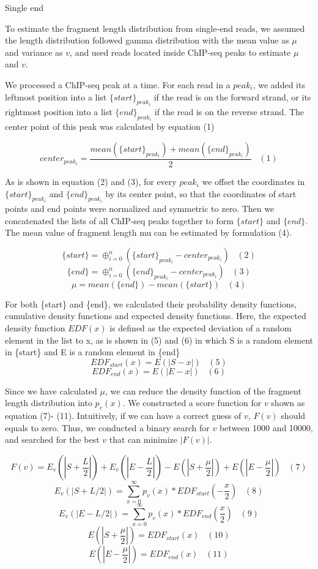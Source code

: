 \documentclass[12pt]{article}
\begin{document}
Single end

To estimate the fragment length distribution from single-end reads, we assumed the length distribution followed gamma distribution with the mean value as $\mu$ and variance as $v$, and used reads located inside ChIP-seq peaks to estimate $\mu$ and $v$.

We processed a ChIP-seq peak at a time. For each read in a $peak_i$, we added its leftmost position into a list $\{start\}_{peak_i}$ if the read is on the forward strand, or its rightmost position into a list $\{end\}_{peak_i}$ if the read is on the reverse strand. The center point of this peak was calculated by equation (1)

$$center_{peak_i} = \frac{mean(\{start\}_{peak_i}) + mean(\{end\}_{peak_i})}{2}\;\;\;(1)$$

As is shown in equation (2) and (3), for every $peak_i$ we offset the coordinates in $\{start\}_{peak_i}$ and $\{end\}_{peak_i}$ by its center point, so that the coordinates of start points and end points were normalized and symmetric to zero. Then we concatenated the lists of all ChIP-seq peaks together to form $\{start\}$ and $\{end\}$. The mean value of fragment length mu can be estimated by formulation (4).

$$\{start\} = \oplus_{i=0}^{n} (\{start\}_{peak_i} - center_{peak_i})\;\;\;(2)$$
$$\{end\} = \oplus_{i=0}^{n} (\{end\}_{peak_i} - center_{peak_i})\;\;\;(3)$$
$$\mu = mean(\{end\}) - mean(\{start\})\;\;\;(4)$$

For both \{start\} and \{end\}, we calculated their probability density functions, cumulative density functions and expected density functions. Here, the expected density function $EDF(x)$ is defined as the expected deviation of a random element in the list to x, as is shown in (5) and (6) in which S is a random element in \{start\} and E is a random element in \{end\}
$$EDF_{start}(x) = E(|S - x|)\;\;\;(5)$$
$$EDF_{end}(x) = E(|E - x|)\;\;\;(6)$$

Since we have calculated $\mu$, we can reduce the density function of the fragment length distribution into $p_v(x)$. We constructed a score function for $v$ shown as equation (7)- (11). Intuitively, if we can have a correct guess of $v$, $F(v)$ should equals to zero. Thus, we conducted a binary search for $v$ between 1000 and 10000, and searched for the best $v$ that can minimize $|F(v)|$.

$$F(v) = E_v(|S + \frac{L}{2}|) + E_v(|E - \frac{L}{2}|) - E(|S + \frac{\mu}{2}|) + E(|E- \frac{\mu}{2}|)\;\;\;(7)$$
$$E_v(|S + L/2|) = \sum_{x=0}^\infty p_v(x) * EDF_{start}(-\frac{x}{2})\;\;\;(8)$$
$$E_v(|E - L/2|) = \sum_{x=0}^\infty p_v(x) * EDF_{end}(\frac{x}{2})\;\;\;(9)$$
$$E(|S + \frac{\mu}{2}|)=EDF_{start}(x)\;\;\;(10)$$
$$E(|E - \frac{\mu}{2}|)=EDF_{end}(x)\;\;\;(11)$$
\end{document}
